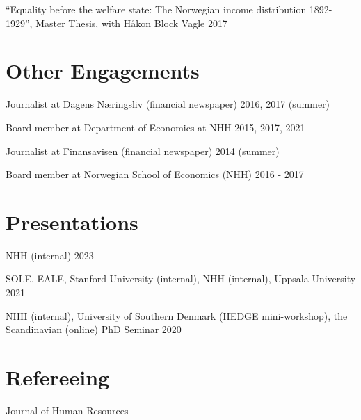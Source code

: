\documentclass[11pt,]{article}
\begin{document}
``Equality before the welfare state: The Norwegian income distribution
1892-1929'', Master Thesis, with Håkon Block Vagle
\hfill 2017\vspace{-0.2cm}

\vspace{0.5cm}

\hypertarget{other-engagements}{%
\section{Other Engagements}\label{other-engagements}}

Journalist at Dagens Næringsliv (financial newspaper) \hfill 2016, 2017
(summer)\vspace{-0.2cm}

Board member at Department of Economics at NHH \hfill 2015, 2017,
2021\vspace{-0.2cm}

Journalist at Finansavisen (financial newspaper) \hfill 2014
(summer)\vspace{-0.2cm}

Board member at Norwegian School of Economics (NHH) \hfill 2016 -
2017\vspace{-0.2cm}

\vspace{0.5cm}

\hypertarget{presentations}{%
\section{Presentations}\label{presentations}}

NHH (internal) \hfill 2023\vspace{-0.2cm}

SOLE, EALE, Stanford University (internal), NHH (internal), Uppsala
University \hfill 2021\vspace{-0.2cm}

NHH (internal), University of Southern Denmark (HEDGE mini-workshop),
the Scandinavian (online) PhD Seminar \hfill 2020\vspace{-0.2cm}

\vspace{0.5cm}

\hypertarget{refereeing}{%
\section{Refereeing}\label{refereeing}}

Journal of Human Resources\vspace{-0.2cm}
\end{document}
